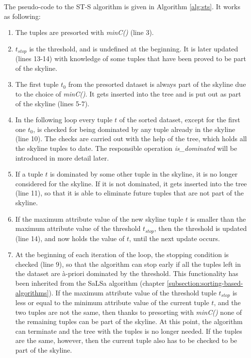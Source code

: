 The pseudo-code to the ST-S algorithm is given in Algorithm \ref{alg:sts}. It works as following: 
\begin{enumerate}
	\item The tuples are presorted with \textit{minC()} (line 3).
	\item $t_{stop}$ is the threshold, and is undefined at the beginning. It is later updated (lines 13-14) with knowledge of some tuples that have been proved to be part of the skyline. 
	\item The first tuple $t_{0}$ from the presorted dataset is always part of the skyline due to the choice of \textit{minC()}. It gets inserted into the tree and is put out as part of the skyline (lines 5-7). 
	\item In the following loop every tuple $t$ of the sorted dataset, except for the first one $t_{0}$, is checked for being dominated by any tuple already in the skyline (line 10). The checks are carried out with the help of the tree, which holds all the skyline tuples to date. The responsible operation \textit{is\_dominated} will be introduced in more detail later. 
	\item If a tuple $t$ is dominated by some other tuple in the skyline, it is no longer considered for the skyline. If it is not dominated, it gets inserted into the tree (line 11), so that it is able to eliminate future tuples that are not part of the skyline. 
	\item If the maximum attribute value of the new skyline tuple $t$ is smaller than the maximum attribute value of the threshold $t_{stop}$, then the threshold is updated (line 14), and now holds the value of $t$, until the next update occurs. 
	\item At the beginning of each iteration of the loop, the stopping condition is checked (line 9), so that the algorithm can stop early if all the tuples left in the dataset are \`{a}-priori dominated by the threshold. This functionality has been inherited from the SaLSa algorithm (chapter \ref{subsection:sorting-based-algorithms}). If the maximum attribute value of the threshold tuple $t_{stop}$ is less or equal to the minimum attribute value of the current tuple $t$, and the two tuples are not the same, then thanks to presorting with \textit{minC()} none of the remaining tuples can be part of the skyline. At this point, the algorithm can terminate and the tree with the tuples is no longer needed. If the tuples are the same, however, then the current tuple also has to be checked to be part of the skyline. 
\end{enumerate}

